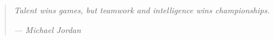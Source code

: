 \documentclass[12pt,a4paper]{report}
\begin{document}

\newpage
\section*{}
%
\hfill
\hfill


\newpage
\section*{}
\begin{quotation}
\textit{Talent wins games, but teamwork and intelligence wins championships.}

\hfill \textsl{--- Michael Jordan}
\end{quotation}

%
\hfill


\tableofcontents
\cleardoublepage

\listoffigures	%
\listoftables  %


%
%
%
%
%
%
%

\hfill
\hfill



\end{document}
